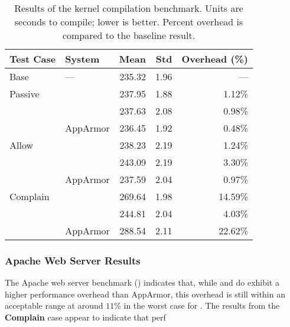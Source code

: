 \begingroup\small
\begin{longtable}[c]{llrrr}
  \caption[Results of the kernel compilation benchmark]{
    Results of the kernel compilation benchmark. Units are seconds to compile; lower is
    better. Percent overhead is compared to the baseline result.
  }%
  \label{tab:phoronix-kernel}\\
  \toprule
   Test Case & System         &  Mean  & Std  & Overhead (\%)\\
   \midrule
   Base      & ---            & 235.32 & 1.96 & ---     \\
   \midrule
   Passive   & \bpfbox{}      & 237.95 & 1.88 &  1.12\% \\
             & \bpfcontain{}  & 237.63 & 2.08 &  0.98\% \\
             & AppArmor       & 236.45 & 1.92 &  0.48\% \\
   \midrule
   Allow     & \bpfbox{}      & 238.23 & 2.19 &  1.24\% \\
             & \bpfcontain{}  & 243.09 & 2.19 &  3.30\% \\
             & AppArmor       & 237.59 & 2.04 &  0.97\% \\
   \midrule
   Complain  & \bpfbox{}      & 269.64 & 1.98 & 14.59\% \\
             & \bpfcontain{}  & 244.81 & 2.04 &  4.03\% \\
             & AppArmor       & 288.54 & 2.11 & 22.62\% \\
  \bottomrule
\end{longtable}
\endgroup


\subsubsection{Apache Web Server Results}

The Apache web server benchmark () indicates that, while
\bpfbox{} and \bpfcontain{} do exhibit a higher performance overhead than AppArmor, this
overhead is still within an acceptable range at around $11\%$ in the worst case for
\bpfcontain{}. The results from the \textbf{Complain} case appear to indicate that
\bpfbox{} perf

